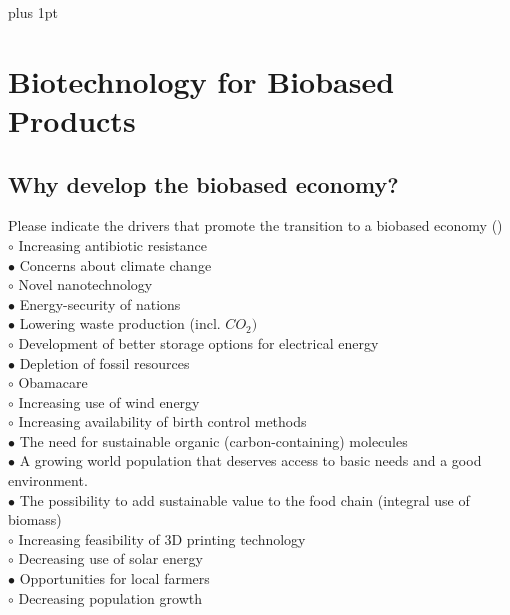 \documentclass[]{beamer}
\begin{document}
\begin{CJK}{UTF8}{gbsn}
\parskip=1cm plus 1pt
\section{Biotechnology for Biobased Products}
\subsection{ Why develop the biobased economy?}
\setcounter{answers}{0}


\begin{frame}[shrink] {} 
\addtocounter{answers}{1}
\color{blue}
  Please indicate the drivers that promote the transition to a biobased economy
 ({})\\
\color{black}
\setlength{\parindent}{-0.4cm}
{\color{red}$\circ$} Increasing antibiotic resistance  \\
{\color{red}$\bullet$} Concerns about climate change  \\
{\color{red}$\circ$} Novel nanotechnology   \\
{\color{red}$\bullet$} Energy-security of nations  \\
{\color{red}$\bullet$} Lowering waste production (incl. $CO_{2})$   \\
{\color{red}$\circ$} Development of better storage options for electrical energy  \\
{\color{red}$\bullet$} Depletion of fossil resources   \\
{\color{red}$\circ$} Obamacare  \\
{\color{red}$\circ$} Increasing use of wind energy  \\
{\color{red}$\circ$} Increasing availability of birth control methods  \\
{\color{red}$\bullet$} The need for sustainable organic (carbon-containing) molecules  \\
{\color{red}$\bullet$} A growing world population that deserves access to basic needs and a good environment.  \\
{\color{red}$\bullet$} The possibility to add sustainable value to the food chain (integral use of biomass)  \\
{\color{red}$\circ$} Increasing feasibility of 3D printing technology  \\
{\color{red}$\circ$} Decreasing use of solar energy  \\
{\color{red}$\bullet$} Opportunities for local farmers  \\
{\color{red}$\circ$} Decreasing population growth  \\
\end{frame}



\end{CJK}
\end{document}
